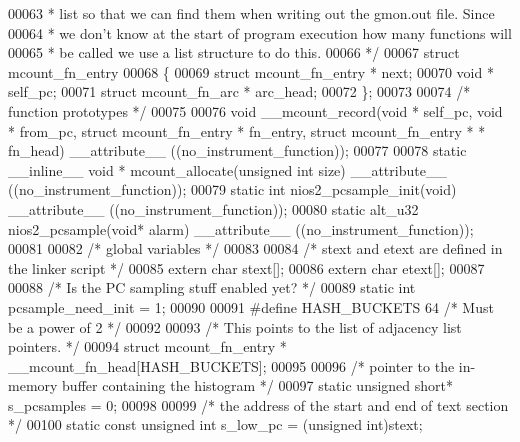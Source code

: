 \begin{DoxyCode}
{00063 \textcolor{comment}{ * list so that we can find them when writing out the gmon.out file. Since}
00064 \textcolor{comment}{ * we don't know at the start of program execution how many functions will}
00065 \textcolor{comment}{ * be called we use a list structure to do this.}
00066 \textcolor{comment}{ */}
00067 \textcolor{keyword}{struct }mcount_fn_entry
00068 \{
00069   \textcolor{keyword}{struct }mcount_fn_entry * next;
00070   \textcolor{keywordtype}{void} * self_pc;
00071   \textcolor{keyword}{struct }mcount_fn_arc * arc_head;
00072 \};
00073 
00074 \textcolor{comment}{/* function prototypes */}
00075 
00076 \textcolor{keywordtype}{void} __mcount_record(\textcolor{keywordtype}{void} * self\_pc, \textcolor{keywordtype}{void} * from_pc, \textcolor{keyword}{struct} mcount_fn_entry * fn\_entry, \textcolor{keyword}{struct} 
      mcount_fn_entry * * fn\_head) __attribute__ ((no\_instrument\_function));
00077 
00078 \textcolor{keyword}{static} \_\_inline\_\_ \textcolor{keywordtype}{void} * mcount_allocate(\textcolor{keywordtype}{unsigned} \textcolor{keywordtype}{int} size) __attribute__ ((no\_instrument\_function));
00079 \textcolor{keyword}{static} \textcolor{keywordtype}{int} nios2_pcsample_init(\textcolor{keywordtype}{void}) __attribute__ ((no\_instrument\_function));
00080 static alt_u32 nios2_pcsample(\textcolor{keywordtype}{void}* alarm) __attribute__ ((no\_instrument\_function));
00081 
00082 \textcolor{comment}{/* global variables */}
00083 
00084 \textcolor{comment}{/* stext and etext are defined in the linker script */}
00085 extern \textcolor{keywordtype}{char} stext[];
00086 extern \textcolor{keywordtype}{char} etext[];
00087 
00088 \textcolor{comment}{/* Is the PC sampling stuff enabled yet? */}
00089 static \textcolor{keywordtype}{int} pcsample\_need\_init = 1;
00090 
00091 \textcolor{preprocessor}{#define HASH\_BUCKETS 64 }\textcolor{comment}{/* Must be a power of 2 */}\textcolor{preprocessor}{}
00092 
00093 \textcolor{comment}{/* This points to the list of adjacency list pointers. */}
00094 \textcolor{keyword}{struct }mcount_fn_entry * \_\_mcount\_fn\_head[HASH_BUCKETS];
00095 
00096 \textcolor{comment}{/* pointer to the in-memory buffer containing the histogram */}
00097 \textcolor{keyword}{static} \textcolor{keywordtype}{unsigned} \textcolor{keywordtype}{short}* s\_pcsamples = 0;
00098 
00099 \textcolor{comment}{/* the address of the start and end of text section */}
00100 \textcolor{keyword}{static} \textcolor{keyword}{const} \textcolor{keywordtype}{unsigned} \textcolor{keywordtype}{int} s\_low\_pc  = (\textcolor{keywordtype}{unsigned} int)stext;
}
\end{DoxyCode}
